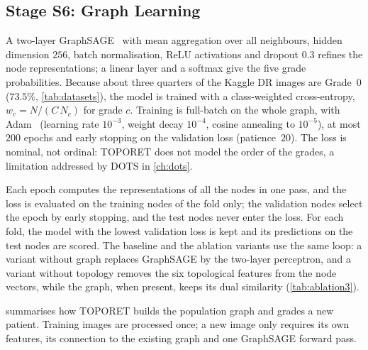\subsection{Stage S6: Graph Learning}
\label{sec:ch3-gnn}

A two-layer GraphSAGE~\cite{hamilton2017graphsage} with mean aggregation over all
neighbours, hidden dimension $256$, batch normalisation, ReLU activations and dropout $0.3$
refines the node representations; a linear layer and a softmax give the five grade
probabilities. Because about three quarters of the Kaggle DR images are Grade~0 ($73.5\%$,
\cref{tab:datasets}), the model is trained with a class-weighted cross-entropy,
$w_c=N/(C\,N_c)$ for grade $c$. Training is full-batch on the whole graph, with
Adam~\cite{kingma2015adam} (learning rate $10^{-3}$, weight decay $10^{-4}$, cosine annealing
to $10^{-5}$), at most $200$ epochs and early stopping on the validation loss (patience~$20$). The loss is nominal, not
ordinal: TOPORET does not model the order of the grades, a limitation addressed by DOTS
in \cref{ch:dots}.

Each epoch computes the representations of all the nodes in one pass, and the loss is
evaluated on the training nodes of the fold only; the validation nodes select the epoch by
early stopping, and the test nodes never enter the loss. For each fold, the model with the
lowest validation loss is kept and its predictions on the test nodes are scored. The
baseline and the ablation variants use the same loop: a variant without graph replaces
GraphSAGE by the two-layer perceptron, and a variant without topology removes the six
topological features from the node vectors, while the graph, when present, keeps its dual
similarity (\cref{tab:ablation3}).

 summarises how TOPORET builds the population graph and grades a new
patient. Training images are processed once; a new image only requires its own features,
its connection to the existing graph and one GraphSAGE forward pass.

